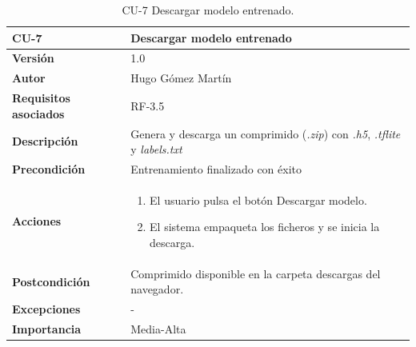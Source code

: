 \begin{table}[p]
	\centering
	\begin{tabularx}{\linewidth}{ p{} p{} }
		\toprule
		\textbf{CU-7}    & \textbf{Descargar modelo entrenado}\\
		\toprule
		\textbf{Versión}              & 1.0    \\
		\textbf{Autor}                & Hugo Gómez Martín \\
		\textbf{Requisitos asociados} & RF-3.5 \\
		\textbf{Descripción}          & Genera y descarga un comprimido (\textit{.zip}) con \textit{.h5}, \textit{.tflite} y \textit{labels.txt} \\
		\textbf{Precondición}         & Entrenamiento finalizado con éxito \\
		\textbf{Acciones}             &
		\begin{enumerate}
			\def\labelenumi{\arabic{enumi}.}
			\tightlist
			\item El usuario pulsa el botón Descargar modelo.
			\item El sistema empaqueta los ficheros y se inicia la descarga.
		\end{enumerate}\\
		\textbf{Postcondición}        & Comprimido disponible en la carpeta descargas del navegador. \\
		\textbf{Excepciones}          & - \\
		\textbf{Importancia}          & Media-Alta \\
		\bottomrule
	\end{tabularx}
	\caption{CU-7 Descargar modelo entrenado.}
\end{table}


